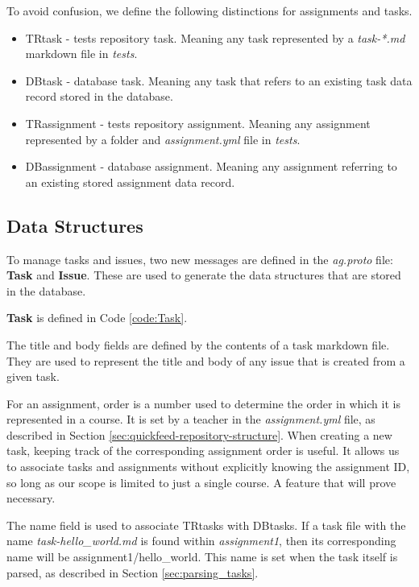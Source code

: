 To avoid confusion, we define the following distinctions for assignments and tasks.
\begin{itemize}
    \item TRtask - tests repository task. Meaning any task represented by a \textit{task-*.md} markdown file in \textit{tests}.
    \item DBtask - database task. Meaning any task that refers to an existing task data record stored in the database.
    \item TRassignment - tests repository assignment. Meaning any assignment represented by a folder and \textit{assignment.yml} file
    in \textit{tests}. 
    \item DBassignment - database assignment. Meaning any assignment referring to an existing stored assignment data record.
\end{itemize}

\subsection{Data Structures}
\label{sec:tasks-and-issues-data-structures}

To manage tasks and issues, two new messages are defined in the \textit{ag.proto} file: \textbf{Task} and \textbf{Issue}.
These are used to generate the data structures that are stored in the database.

\textbf{Task} is defined in Code \ref{code:Task}.



The title and body fields are defined by the contents of a task markdown file.
They are used to represent the title and body of any issue that is created from a given task.

For an assignment, order is a number used to determine the order in which it is represented in a course.
It is set by a teacher in the \textit{assignment.yml} file, as described in Section \ref{sec:quickfeed-repository-structure}.
When creating a new task, keeping track of the corresponding assignment order is useful.
It allows us to associate tasks and assignments without explicitly knowing the assignment ID, so long as our scope is limited to just a single course.
A feature that will prove necessary.

The name field is used to associate TRtasks with DBtasks.
If a task file with the name \textit{task-hello\_world.md} is found within \textit{assignment1}, then its corresponding name will be assignment1/hello\_world.
This name is set when the task itself is parsed, as described in Section \ref{sec:parsing_tasks}.

